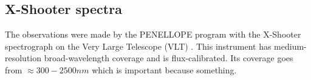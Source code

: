 \documentclass[twocolumn,linenumbers]{aastex631}
\newcommand{\Mdot}{{\dot{{M}}}}
\newcommand{\msun}{ M_{\sun}}
\newcommand{\rsun}{ R_{\sun}}
\newcommand{\lsun}{ L_{\sun}}
\newcommand{\msunyr}{M_{\sun} \, \rm{ yr^{-1}}}
\newcommand{\teff}{T$_{\rm eff}$}
\begin{document}
\begin{table}[]
\caption{Stellar parameters of the CTTS sample \citep{manara2021}}

\centering
{}
\end{table}

\subsection{X-Shooter spectra}

The observations were made by the PENELLOPE program with the X-Shooter spectrograph on the Very Large Telescope (VLT) \citep{vernet2011}. This instrument has medium-resolution broad-wavelength coverage and is flux-calibrated. Its coverage goes from $\approx 300-2500nm$  which is important because something. 
\end{document}
